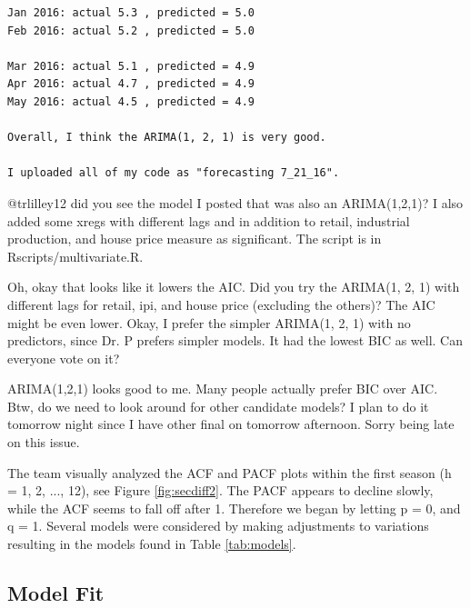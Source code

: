 \documentclass[twoside,twocolumn]{article}
\begin{document}
\begin{verbatim}
Jan 2016: actual 5.3 , predicted = 5.0
Feb 2016: actual 5.2 , predicted = 5.0

Mar 2016: actual 5.1 , predicted = 4.9
Apr 2016: actual 4.7 , predicted = 4.9
May 2016: actual 4.5 , predicted = 4.9

Overall, I think the ARIMA(1, 2, 1) is very good.

I uploaded all of my code as "forecasting 7_21_16".

\end{verbatim}

@trlilley12 did you see the model I posted that was also an ARIMA(1,2,1)? I also added some xregs with different lags and in addition to retail, industrial production, and house price measure as significant. The script is in Rscripts/multivariate.R. 

Oh, okay that looks like it lowers the AIC. Did you try the ARIMA(1, 2, 1) with different lags for retail, ipi, and house price (excluding the others)? The AIC might be even lower.
Okay, I prefer the simpler ARIMA(1, 2, 1) with no predictors, since Dr. P prefers simpler models. It had the lowest BIC as well. Can everyone vote on it?

ARIMA(1,2,1) looks good to me. Many people actually prefer BIC over AIC. Btw, do we need to look around for other candidate models? I plan to do it tomorrow night since I have other final on tomorrow afternoon. Sorry being late on this issue.


      
      The team visually analyzed the ACF and PACF plots within the first season (h = 1, 2, ..., 12), see Figure \ref{fig:secdiff2}. The PACF appears to decline slowly, while the ACF seems to fall off after 1. Therefore we began by letting p = 0, and q = 1. Several models were considered by making adjustments to variations resulting in the models found in Table \ref{tab:models}.\newline
      
      \subsection{Model Fit}
      
\end{document}
